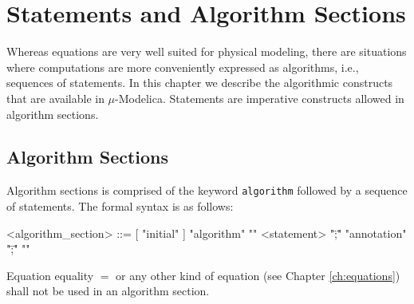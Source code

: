 \documentclass[11pt,a4paper,notitlepage]{report}
\begin{document}
%


\chapter{Statements and Algorithm Sections}\label{ch:statements}
Whereas equations are very well suited for physical modeling, there are situations where computations are more
conveniently expressed as algorithms, i.e., sequences of statements. In this chapter we describe the algorithmic
constructs that are available in $\mu$-Modelica.
Statements are imperative constructs allowed in algorithm sections.

\section{Algorithm Sections}

Algorithm sections is comprised of the keyword \verb"algorithm" followed by a sequence of statements. The formal
syntax is as follows:
\begin{grammar}
<algorithm_section> ::=
[ "initial" ] "algorithm" "{" <statement> "\";\"" 
\alt "annotation" "\";\"" "}"
\end{grammar}
Equation equality $=$ or any other kind of equation (see Chapter \ref{ch:equations}) shall not be used in an algorithm section.
\end{document}
